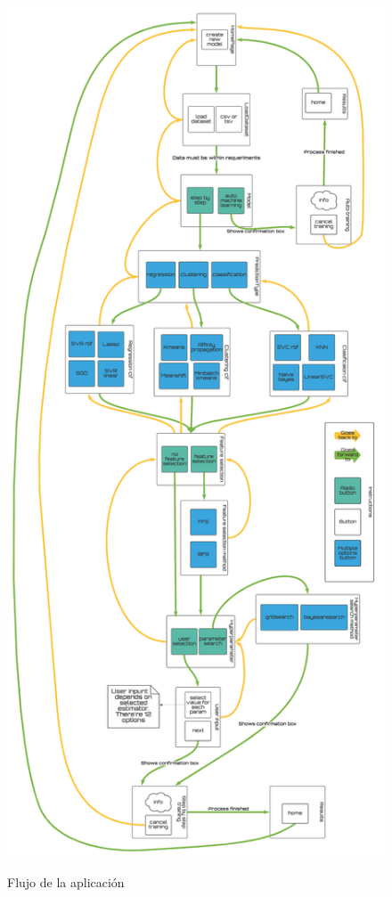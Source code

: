 \begin{figure}[H]
    \centering
    \caption{Flujo de la aplicación}
    \includegraphics[width=\textwidth, height=\textheight,keepaspectratio]{images/appworkflow.png}
    \label{fig:workflow}
\end{figure}

